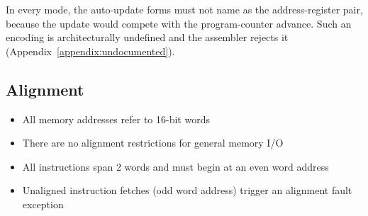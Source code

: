In every mode, the auto-update forms must not name  as the address-register pair, because the update would
compete with the program-counter advance. Such an encoding is architecturally undefined and the assembler rejects it
(Appendix~\ref{appendix:undocumented}).

\subsection{Alignment}

\begin{itemize}
	\item All memory addresses refer to 16-bit words
	\item There are no alignment restrictions for general memory I/O
	\item All instructions span 2 words and must begin at an even word address
	\item Unaligned instruction fetches (odd word address) trigger an alignment fault exception
\end{itemize}

